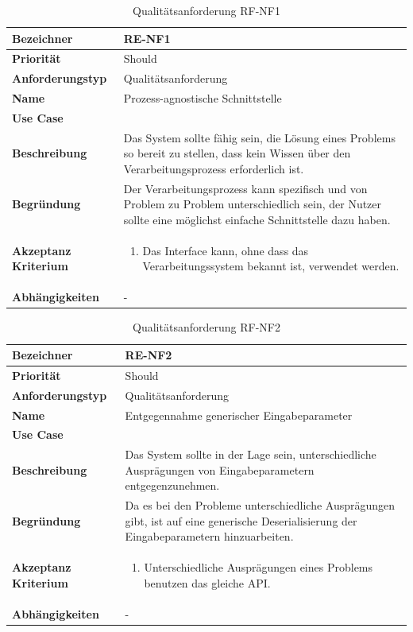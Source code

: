 \begin{table}[ht]
\centering
  \begin{tabular}{ l | p{8cm} }
	\hline
	\rowcolor{gray}
	\textbf{Bezeichner}&	\textbf{RE-NF1}\\ \hline
	\textbf{Priorität} 		&	Should\\ \hline
	\textbf{Anforderungstyp}	&	Qualitätsanforderung\\ \hline
	\textbf{Name} 			&	Prozess-agnostische Schnittstelle\\ \hline
	\textbf{Use Case} 		&	\nameref{table:use_case_1}\\ \hline
	\textbf{Beschreibung} 	&	Das System sollte fähig sein, die Lösung eines Problems so bereit zu stellen, dass kein Wissen über den Verarbeitungsprozess erforderlich ist.\\ \hline
	\textbf{Begründung} 		&	Der Verarbeitungsprozess kann spezifisch und von Problem zu Problem unterschiedlich sein, der Nutzer sollte eine möglichst einfache 
							Schnittstelle dazu haben.\\ \hline
	\textbf{Akzeptanz Kriterium}	&	\begin{enumerate}
					\item Das Interface kann, ohne dass das Verarbeitungssystem bekannt ist, verwendet werden.
					\end{enumerate}
					\\ \hline
	\textbf{Abhängigkeiten} 	&	-\\ \hline
  \end{tabular}
   \caption{Qualitätsanforderung RF-NF1}\label{table:req_nf_1}
\end{table}

\begin{table}[ht]
\centering
  \begin{tabular}{ l | p{8cm} }
	\hline
	\rowcolor{gray}
	\textbf{Bezeichner}&	\textbf{RE-NF2}\\ \hline
	\textbf{Priorität} 		&	Should\\ \hline
	\textbf{Anforderungstyp}	&	Qualitätsanforderung\\ \hline
	\textbf{Name} 			&	Entgegennahme generischer Eingabeparameter\\ \hline
	\textbf{Use Case} 		&	\nameref{table:use_case_1}\\ \hline
	\textbf{Beschreibung} 	&	Das System sollte in der Lage sein, unterschiedliche Ausprägungen von Eingabeparametern entgegenzunehmen.\\ \hline
	\textbf{Begründung} 		&	Da es bei den Probleme unterschiedliche Ausprägungen gibt, ist auf eine generische Deserialisierung der Eingabeparametern hinzuarbeiten.\\ \hline
	\textbf{Akzeptanz Kriterium}	&	\begin{enumerate}
					\item Unterschiedliche Ausprägungen eines Problems benutzen das gleiche API.
					\end{enumerate}
					\\ \hline
	\textbf{Abhängigkeiten} 	&	-\\ \hline
  \end{tabular}
   \caption{Qualitätsanforderung RF-NF2}\label{table:req_nf_2}
\end{table}

